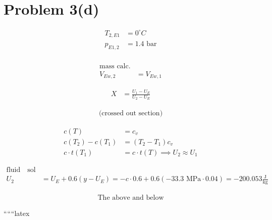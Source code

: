\section*{Problem 3(d)}

\begin{align*}
T_{2, E1} &= 0^\circ C \\
p_{E1, 2} &= 1.4 \text{ bar} \\
\end{align*}

\begin{align*}
\text{mass calc.} \\
V_{Ew, 2} &= V_{Ew, 1}
\end{align*}

\begin{align*}
X &= \frac{U_1 - U_E}{U_2 - U_E}
\end{align*}

\begin{align*}
\text{(crossed out section)}
\end{align*}

\begin{align*}
c(T) &= c_v \\
c(T_2) - c(T_1) &= (T_2 - T_1) c_v \\
c \cdot t(T_1) &= c \cdot t(T) \implies U_2 \approx U_1
\end{align*}

\begin{align*}
\text{fluid} \quad \text{sol} \\
U_2 &= U_E + 0.6 \left( y - U_E \right) = -c \cdot 0.6 + 0.6 \left( -33.3 \text{ MPa} \cdot 0.04 \right) = -200.053 \frac{\text{J}}{\text{kg}}
\end{align*}

\begin{align*}
\text{The above and below}
\end{align*}

``````latex
